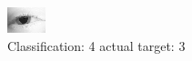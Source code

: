 \begin{figure}[h!]
\begin{center}
\includegraphics[width=0.60\columnwidth]{figures/ID169_class_4_target_3.png}
\end{center}
\caption{ Classification: 4 actual target: 3}
\label{fig:ID169_class_4_target_3}
\end{figure}
